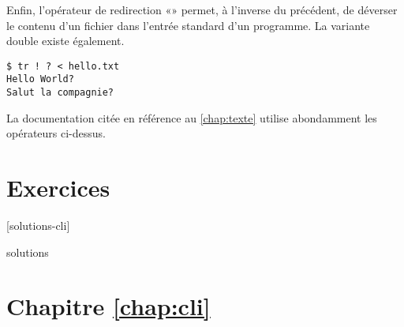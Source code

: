 Enfin, l'opérateur de redirection %
«\code{<}» permet, à l'inverse du précédent,
de déverser le contenu d'un fichier dans l'entrée standard d'un
programme. La variante double existe également.
\begin{Schunk}
\begin{Verbatim}
$ tr ! ? < hello.txt
Hello World?
Salut la compagnie?
\end{Verbatim}
\end{Schunk} %

La documentation citée en référence au \autoref{chap:texte} utilise
abondamment les opérateurs ci-dessus.


\section{Exercices}
\label{sec:cli:exercices}

[solutions-cli]

\begin{Filesave}{solutions}
\section*{Chapitre \ref*{chap:cli}}

\end{Filesave}

